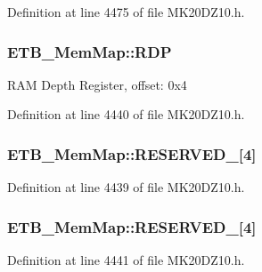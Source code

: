 Definition at line 4475 of file M\+K20\+D\+Z10.\+h.

\subsubsection[{\texorpdfstring{R\+DP}{RDP}}]{ E\+T\+B\+\_\+\+Mem\+Map\+::\+R\+DP}\hypertarget{struct_e_t_b___mem_map_a1c10bbda4ba1bbe562b76e90bcb1bc61}{}\label{struct_e_t_b___mem_map_a1c10bbda4ba1bbe562b76e90bcb1bc61}
R\+AM Depth Register, offset\+: 0x4 

Definition at line 4440 of file M\+K20\+D\+Z10.\+h.

\subsubsection[{\texorpdfstring{R\+E\+S\+E\+R\+V\+E\+D\+\_\+0}{RESERVED_0}}]{ E\+T\+B\+\_\+\+Mem\+Map\+::\+R\+E\+S\+E\+R\+V\+E\+D\+\_\mbox{[}4\mbox{]}}\hypertarget{struct_e_t_b___mem_map_af724f31f25bbd8ea68c27823c1dad054}{}\label{struct_e_t_b___mem_map_af724f31f25bbd8ea68c27823c1dad054}


Definition at line 4439 of file M\+K20\+D\+Z10.\+h.

\subsubsection[{\texorpdfstring{R\+E\+S\+E\+R\+V\+E\+D\+\_\+1}{RESERVED_1}}]{ E\+T\+B\+\_\+\+Mem\+Map\+::\+R\+E\+S\+E\+R\+V\+E\+D\+\_\mbox{[}4\mbox{]}}\hypertarget{struct_e_t_b___mem_map_a46ec445024c6bff3ddf1a8c85eea7fdd}{}\label{struct_e_t_b___mem_map_a46ec445024c6bff3ddf1a8c85eea7fdd}


Definition at line 4441 of file M\+K20\+D\+Z10.\+h.

